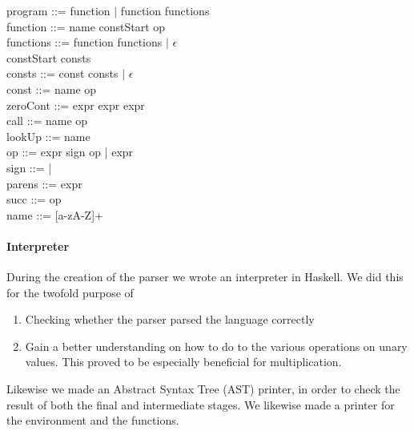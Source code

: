 program ::= function $\mid$ function functions\\

function ::= name \bnf{=>} constStart op\\

functions ::= \bnf{,} function functions $\mid$ $\epsilon$\\

constStart \bnf{[} consts \bnf{]}\\

consts ::= const \bnf{,} consts $\mid$ $\epsilon$\\

const ::= name \bnf{=} op\\

zeroCont ::=  \bnf{(} expr \bnf{)} \bnf{\{} expr \bnf{\}}  \bnf{\{} expr \bnf{\}}\\

call ::=  name op\\

lookUp ::=  name\\

op ::= expr sign op | expr\\

sign ::= \bnf{+} | \bnf{*}\\

parens ::=\bnf{(} expr \bnf{)}\\

succ ::=  op\\

name ::= [a-zA-Z]+

\paragraph{Interpreter}
During the creation of the parser we wrote an interpreter in
Haskell. We did this for the twofold purpose of
\begin{enumerate}
\item Checking whether the parser parsed the language correctly
\item Gain a better understanding on how to do to the various
  operations on unary values. This proved to be especially beneficial
  for multiplication.
\end{enumerate}
Likewise we made an Abstract Syntax Tree (AST) printer, in order to
check the result of both the final and intermediate stages. We
likewise made a printer for the environment and the functions.

